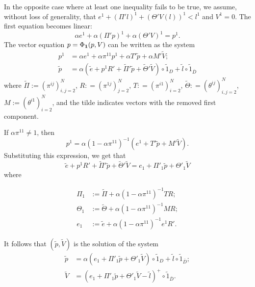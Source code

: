 \begin{multicols}{2}
In the opposite case where at least one inequality fails to be true,  we  assume, without loss of generality, 
that  $e^1 + (\Pi' l)^1 + (\Theta' V(l))^1 < l^1$ and $V^1=0$. The first equation  becomes linear:  
\begin{equation*}
\alpha e^1 + \alpha (\Pi' p)^1 + \alpha (\Theta' V)^1 = p^1.
\end{equation*}
 The vector equation $p=\Phi_{\bf 1}(p, V)$ can be written as the system 
\begin{align*}
p^1&=\alpha e^1+ \alpha  \pi^{11}p^1+  \alpha  T' \tilde p +  \alpha  M' \tilde V;\\
\tilde p&=\alpha\left(\tilde e+p^1R'+\tilde \Pi'\tilde p +\tilde \Theta'\tilde V\right)\circ \tilde 1_{D} + \tilde l \circ \tilde 1_{\bar D}
\end{align*}
where $\tilde \Pi := (\pi^{ij})_{i, j = 2}^N$, 
$R: = (\pi^{1j})_{j=2}^N$, $T: = (\pi^{i1})_{i=2}^N$, 
$\tilde \Theta: = (\theta^{ij})_{i, j = 2}^N$, $M := (\theta^{i1})_{i=2}^N$,  
and the tilde indicates  vectors with the removed first component. 

If $\alpha \pi^{11}\neq 1$, then 
\begin{equation*}
p^1 = \alpha(1 - \alpha \pi^{11})^{-1} \left(e^1 +   T' \tilde p +  M' \tilde V\right).
\end{equation*}
Substituting this expression, we get that  
$$
\tilde e+p^1R'+\tilde \Pi'\tilde p +\tilde \Theta'\tilde V=e_1 +  \Pi'_1 \tilde p + \Theta'_1 \tilde V
$$
where 

\vspace*{-4pt}

\noindent
\begin{align*}
\Pi_1 &:= \tilde \Pi + \alpha\left(1 - \alpha \pi^{11}\right)^{-1}  TR; \\
\Theta_1 &:= \tilde \Theta + \alpha\left(1 - \alpha \pi^{11}\right)^{-1}  MR; \\ 
e_1 &:= \tilde e + \alpha\left(1 - \alpha \pi^{11}\right)^{-1}  e^1 R'.
\end{align*}

\vspace*{-4pt}

\noindent
It follows that $(\tilde p,\tilde V)$ is the solution of the system  
\begin{align*}
\tilde p&=\alpha\left(e_1 +  \Pi'_1 \tilde p + \Theta'_1 \tilde V\right) \circ \tilde 1_{D} + \tilde l \circ \tilde 1_{\bar D}; \\
\tilde V&= \left(e_1 + \Pi'_1 \tilde p + \Theta'_1 \tilde V - \tilde l\right)^+ \circ \tilde 1_{\bar D}.  
\end{align*}


\end{multicols}
